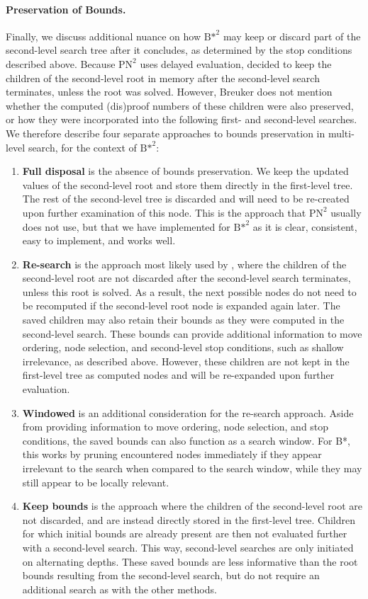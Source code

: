 \paragraph{Preservation of Bounds.}
\label{subsec:BstarSquaredAlgorithm:BoundsPreservation}
Finally, we discuss additional nuance on how ${\text{B*}}^2$ may keep or discard part of the second-level search tree after it concludes, as determined by the stop conditions described above. Because ${\text{PN}^2}$ uses delayed evaluation,  decided to keep the children of the second-level root in memory after the second-level search terminates, unless the root was solved. However, Breuker does not mention whether the computed (dis)proof numbers of these children were also preserved, or how they were incorporated into the following first- and second-level searches. We therefore describe four separate approaches to bounds preservation in multi-level search, for the context of ${\text{B*}}^2$:
\begin{enumerate}
    \item \textbf{Full disposal} is the absence of bounds preservation. We keep the updated values of the second-level root and store them directly in the first-level tree. The rest of the second-level tree is discarded and will need to be re-created upon further examination of this node. This is the approach that ${\text{PN}}^2$ usually does not use, but that we have implemented for ${\text{B*}}^2$ as it is clear, consistent, easy to implement, and works well.
    \item \textbf{Re-search} is the approach most likely used by , where the children of the second-level root are not discarded after the second-level search terminates, unless this root is solved. As a result, the next possible nodes do not need to be recomputed if the second-level root node is expanded again later.
    The saved children may also retain their bounds as they were computed in the second-level search. These bounds can provide additional information to move ordering, node selection, and second-level stop conditions, such as shallow irrelevance, as described above. However, these children are not kept in the first-level tree as computed nodes and will be re-expanded upon further evaluation.
    \item \textbf{Windowed} is an additional consideration for the re-search approach. Aside from providing information to move ordering, node selection, and stop conditions, the saved bounds can also function as a search window. For B*, this works by pruning encountered nodes immediately if they appear irrelevant to the search when compared to the search window, while they may still appear to be locally relevant.
    \item \textbf{Keep bounds} is the approach where the children of the second-level root are not discarded, and are instead directly stored in the first-level tree. Children for which initial bounds are already present are then not evaluated further with a second-level search. This way, second-level searches are only initiated on alternating depths. These saved bounds are less informative than the root bounds resulting from the second-level search, but do not require an additional search as with the other methods.
\end{enumerate}
